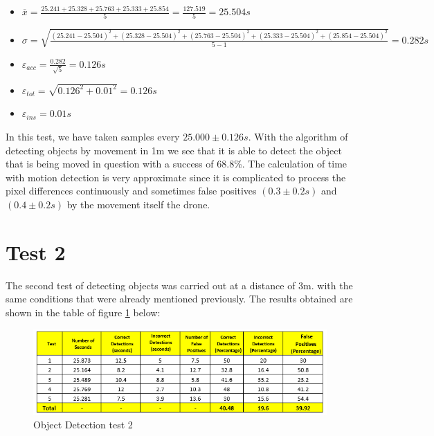 \pagebreak
\begin{itemize}
	\item $ \overline{x} = \frac{25.241 +  25.328 + 25.763  + 25.333 +  25.854} {5} = \frac{127.519}{5} = 25.504s $ 	
	\item $ \sigma =  {\sqrt{\frac{(25.241 - 25.504)^2 +  (25.328 - 25.504)^2 + (25.763 - 25.504)^2  + (25.333 - 25.504)^2+  (25.854 - 25.504)^2}{5 - 1}}} = 0.282s$
	\item $\varepsilon{_{acc}} =  {\frac{0.282}{\sqrt{5}}} = 0.126s$
	\item $\varepsilon{_{tot}}=  {\sqrt{0.126^{2} + 0.01^{2}}} = 0.126s$
	\item $ \varepsilon{_{ins}} =  {0.01s} $ 	
\end{itemize}

In this test, we have taken samples every \begin{math}25.000\pm0.126s\end{math}. With the algorithm of detecting objects by movement in 1m we see that it is able to detect the object that is being moved in question with a success of 68.8\%. The calculation of time with motion detection is very approximate since it is complicated to process the pixel differences continuously and sometimes false positives \begin{math}(0.3\pm0.2 s)\end{math} and \begin{math}(0.4\pm0.2 s)\end{math} by the movement itself the drone.


\section{Test 2}
The second test of detecting objects was carried out at a distance of 3m. with the same conditions that were already mentioned previously. The results obtained are shown in the table of figure \ref{object_table_2} below:

\begin{figure}[ht]
\centering
\includegraphics[scale=0.8]{figures/test_table_2.png}
\caption{Object Detection test 2}
\label{object_table_2}
\end{figure}

